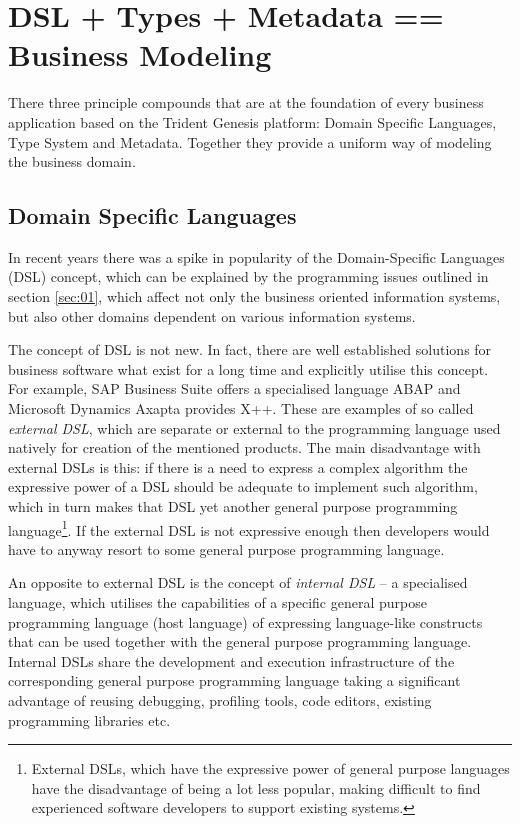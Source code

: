 \section{DSL + Types + Metadata == Business Modeling}\label{sec:03}

  There three principle compounds that are at the foundation of every business application based on the Trident Genesis platform: Domain Specific Languages, Type System and Metadata.
  Together they provide a uniform way of modeling the business domain.

\subsection{Domain Specific Languages}

  In recent years there was a spike in popularity of the Domain-Specific Languages (DSL) concept, which can be explained by the programming issues outlined in section \ref{sec:01}, which affect not only the business oriented information systems, but also other domains dependent on various information systems.

  The concept of DSL is not new.
  In fact, there are well established solutions for business software what exist for a long time and explicitly utilise this concept.
  For example, SAP Business Suite offers a specialised language ABAP and Microsoft Dynamics Axapta provides X++.
  These are examples of so called \emph{external DSL}, which are separate or external to the programming language used natively for creation of the mentioned products.
  The main disadvantage with external DSLs is this: if there is a need to express a complex algorithm the expressive power of a DSL should be adequate to implement such algorithm, which in turn makes that DSL yet another general purpose programming language\footnote{External DSLs, which have the expressive power of general purpose languages have the disadvantage of being a lot less popular, making difficult to find experienced software developers to support existing systems.}.
  If the external DSL is not expressive enough then developers would have to anyway resort to some general purpose programming language.

  An opposite to external DSL is the concept of \emph{internal DSL} -- a specialised language, which utilises the capabilities of a specific general purpose programming language (host language) of expressing language-like constructs that can be used together with the general purpose programming language.
  Internal DSLs share the development and execution infrastructure of the corresponding general purpose programming language taking a significant advantage of reusing debugging, profiling tools, code editors, existing programming libraries etc.

